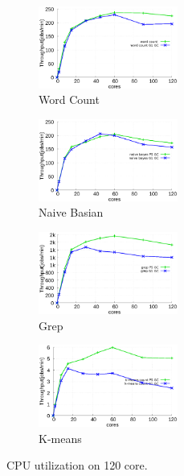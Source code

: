 
\begin{figure}[tb]
    \centering
    \begin{subfigure}[b]{0.25\textwidth}
        \includegraphics[width=1.8in]{graph/wc.eps}
        \caption{Word Count}
    \end{subfigure}%
    \begin{subfigure}[b]{0.25\textwidth}
        \includegraphics[width=1.8in]{graph/nb.eps}
        \caption{Naive Basian}
    \end{subfigure}%
    \begin{subfigure}[b]{0.25\textwidth}
        \includegraphics[width=1.8in]{graph/grep.eps}
        \caption{Grep}
    \end{subfigure}%
    \begin{subfigure}[b]{0.25\textwidth}
        \includegraphics[width=1.8in]{graph/kmeans.eps}
        \caption{K-means}
    \end{subfigure}%
    \caption{CPU utilization on 120 core.}
    \label{fig:utilization}
\end{figure}



